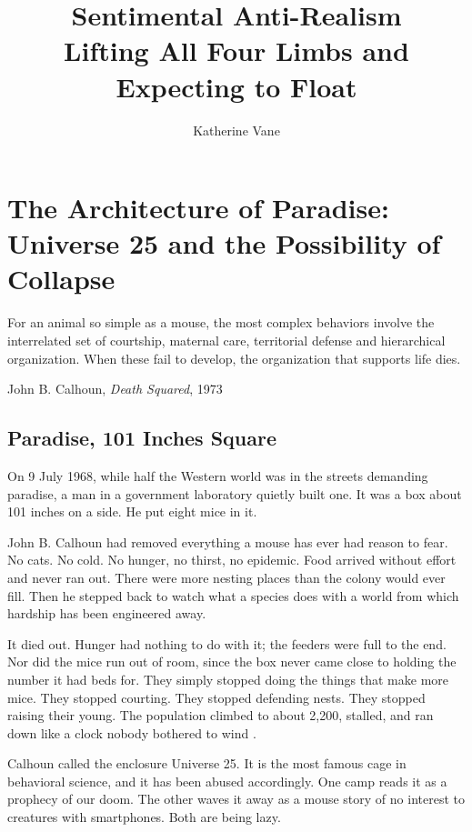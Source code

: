 \documentclass[12pt,a4paper]{book}
\title{Sentimental Anti-Realism\\[0.6em]
\large Lifting All Four Limbs and Expecting to Float}
\author{Katherine Vane}
\date{}
\begin{document}
\maketitle
\tableofcontents


\chapter[Universe 25 and the Possibility of Collapse]{The Architecture of Paradise: Universe 25 and the Possibility of Collapse}

\epigraph{For an animal so simple as a mouse, the most complex behaviors involve the interrelated set of courtship, maternal care, territorial defense and hierarchical organization. When these fail to develop, the organization that supports life dies.}{John B. Calhoun, \emph{Death Squared}, 1973 \cite{calhoun1973}}

\section{Paradise, 101 Inches Square}

On 9 July 1968, while half the Western world was in the streets demanding paradise, a man in a government laboratory quietly built one. It was a box about 101 inches on a side. He put eight mice in it.

John B. Calhoun had removed everything a mouse has ever had reason to fear. No cats. No cold. No hunger, no thirst, no epidemic. Food arrived without effort and never ran out. There were more nesting places than the colony would ever fill. Then he stepped back to watch what a species does with a world from which hardship has been engineered away.

It died out. Hunger had nothing to do with it; the feeders were full to the end. Nor did the mice run out of room, since the box never came close to holding the number it had beds for. They simply stopped doing the things that make more mice. They stopped courting. They stopped defending nests. They stopped raising their young. The population climbed to about 2,200, stalled, and ran down like a clock nobody bothered to wind \cite{calhoun1973}.

Calhoun called the enclosure Universe 25. It is the most famous cage in behavioral science, and it has been abused accordingly. One camp reads it as a prophecy of our doom. The other waves it away as a mouse story of no interest to creatures with smartphones. Both are being lazy.
\end{document}
